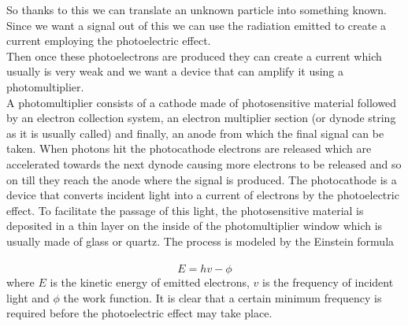 So thanks to this we can translate an unknown particle into something known. 
Since we want a signal out of this we can use the radiation emitted to create a current 
employing the photoelectric effect.\\ 
Then once these photoelectrons are produced they can create a current which usually is very
weak and we want a device that can amplify it using a photomultiplier.\\
A photomultiplier consists of a cathode made of photosensitive material followed by an
electron collection system, an electron multiplier section (or dynode string as it is usually called)
and finally, an anode from which the final signal can be taken.
When photons hit the photocathode electrons are released which are accelerated towards
the next dynode causing more electrons to be released and so on till they reach the anode
where the signal is produced. The photocathode is a device that converts incident light
into a current of electrons by the photoelectric effect. To facilitate the passage of this light,
the photosensitive material is deposited in a thin layer on the inside of the photomultiplier
window which is usually made of glass or quartz.
The process is modeled by the Einstein formula\\\\
\begin{equation*}
E=hv - \phi 
\end{equation*}
where $E$ is the kinetic energy of emitted electrons, $v$ is the frequency of incident light
and $\phi$ the work function. It is clear that a certain minimum frequency
is required before the photoelectric effect may take place.
